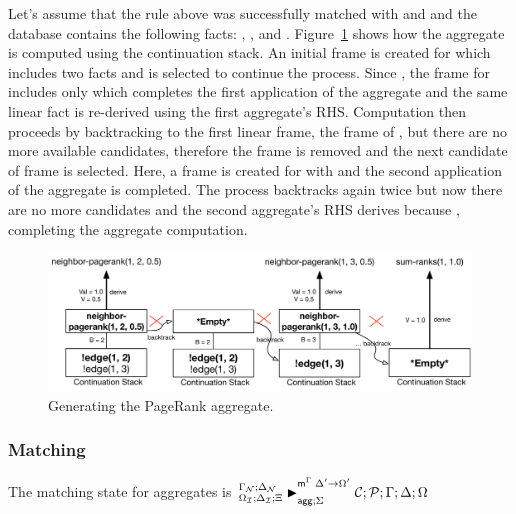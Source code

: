 Let's assume that the rule above was successfully matched with  and
 and the database contains the following facts: , ,  and
. Figure~\ref{fig:logic:backtrack} shows how
the aggregate is computed using the continuation stack. An initial frame is
created for  which includes two  facts and
 is selected to continue the process. Since ,
the frame for  includes only
 which completes the first application of the
aggregate and the same linear fact is re-derived using the first aggregate's
RHS.  Computation then proceeds by backtracking to the first linear frame, the
frame of , but there are no more available
candidates, therefore the frame is removed and the next candidate  of frame  is selected. Here, a frame is
created for  with  and the second
application of the aggregate is completed. The process backtracks again twice
but now there are no more candidates and the second aggregate's RHS derives
 because , completing the aggregate
computation.

\begin{figure}[ht]
   \begin{center}
      \includegraphics[width=0.85\linewidth]{figures/logical_foundations/backtrack.pdf}
   \end{center}
   \caption{Generating the PageRank aggregate.}
   \label{fig:logic:backtrack}
\end{figure}

\subsubsection{Matching}

The matching state for aggregates is 
$\matstatea{\deltan}{\lstack{C};
   \lstack{P}}{\Gamma}{\Delta}{\Omega}{\Delta' \rightarrow \Omega'}{\Sigma}$

